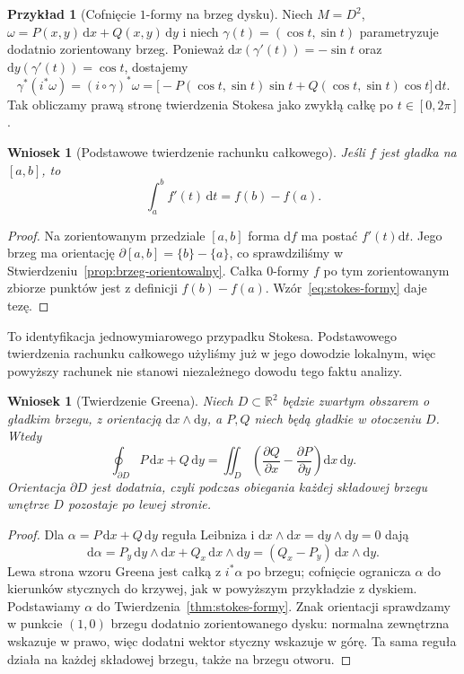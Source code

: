 \documentclass[11pt,a4paper,oneside]{report}
\newcommand{\R}{\mathbb{R}}
\newcommand{\dd}{\mathrm d}
\theoremstyle{plain}
\newtheorem{wniosek}[twierdzenie]{Wniosek}
\theoremstyle{definition}
\newtheorem{przyklad}[twierdzenie]{Przykład}
\theoremstyle{remark}
\begin{document}
\begin{przyklad}[Cofnięcie $1$-formy na brzeg dysku]
Niech $M=D^2$, $\omega=P(x,y)\,\dd x+Q(x,y)\,\dd y$
i niech $\gamma(t)=(\cos t,\sin t)$ parametryzuje
dodatnio zorientowany brzeg. Ponieważ
$\dd x(\gamma'(t))=-\sin t$ oraz
$\dd y(\gamma'(t))=\cos t$, dostajemy
\[
 \gamma^*(i^*\omega)
 =(i\circ\gamma)^*\omega
 =\bigl[-P(\cos t,\sin t)\sin t
       +Q(\cos t,\sin t)\cos t\bigr]\,\dd t.
\]
Tak obliczamy prawą stronę twierdzenia Stokesa
jako zwykłą całkę po $t\in[0,2\pi]$.
\end{przyklad}

\begin{wniosek}[Podstawowe twierdzenie rachunku całkowego]
\label{cor:stokes-ftc}
Jeśli $f$ jest gładka na $[a,b]$, to
\[
 \int_a^b f'(t)\,\dd t=f(b)-f(a).
\]
\end{wniosek}
\begin{proof}
Na zorientowanym przedziale $[a,b]$ forma $\dd f$
ma postać $f'(t)\dd t$. Jego brzeg ma orientację
$\partial[a,b]=\{b\}-\{a\}$, co sprawdziliśmy
w Stwierdzeniu~\ref{prop:brzeg-orientowalny}.
Całka $0$-formy $f$ po tym zorientowanym
zbiorze punktów jest z definicji $f(b)-f(a)$.
Wzór~\eqref{eq:stokes-formy} daje tezę.
\end{proof}
To identyfikacja jednowymiarowego przypadku Stokesa.
Podstawowego twierdzenia rachunku całkowego użyliśmy
już w jego dowodzie lokalnym, więc powyższy rachunek
nie stanowi niezależnego dowodu tego faktu analizy.

\begin{wniosek}[Twierdzenie Greena]
\label{cor:stokes-green}
Niech $D\subset\R^2$ będzie zwartym obszarem
o gładkim brzegu, z orientacją $\dd x\wedge\dd y$,
a $P,Q$ niech będą gładkie w otoczeniu $D$. Wtedy
\[
 \oint_{\partial D}P\,\dd x+Q\,\dd y
 =\iint_D\left(\frac{\partial Q}{\partial x}
             -\frac{\partial P}{\partial y}\right)
       \dd x\,\dd y.
\]
Orientacja $\partial D$ jest dodatnia, czyli
podczas obiegania każdej składowej brzegu
wnętrze $D$ pozostaje po lewej stronie.
\end{wniosek}
\begin{proof}
Dla $\alpha=P\,\dd x+Q\,\dd y$ reguła
Leibniza i $\dd x\wedge\dd x
=\dd y\wedge\dd y=0$ dają
\[
 \dd\alpha
 =P_y\,\dd y\wedge\dd x
  +Q_x\,\dd x\wedge\dd y
 =(Q_x-P_y)\,\dd x\wedge\dd y.
\]
Lewa strona wzoru Greena jest całką z
$i^*\alpha$ po brzegu; cofnięcie ogranicza
$\alpha$ do kierunków stycznych do krzywej,
jak w powyższym przykładzie z dyskiem. Podstawiamy $\alpha$ do
Twierdzenia~\ref{thm:stokes-formy}.
Znak orientacji sprawdzamy w punkcie
$(1,0)$ brzegu dodatnio zorientowanego dysku:
normalna zewnętrzna wskazuje w prawo, więc
dodatni wektor styczny wskazuje w górę.
Ta sama reguła działa na każdej składowej
brzegu, także na brzegu otworu.
\end{proof}
\end{document}
